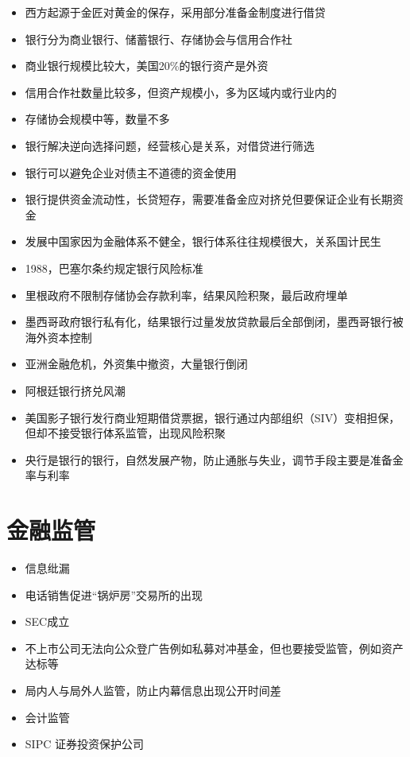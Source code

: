 \documentclass[]{book}
\providecommand{\tightlist}{%
  \setlength{\itemsep}{0pt}\setlength{\parskip}{0pt}}
\begin{document}
\begin{itemize}
\tightlist
\item
  西方起源于金匠对黄金的保存，采用部分准备金制度进行借贷
\item
  银行分为商业银行、储蓄银行、存储协会与信用合作社
\item
  商业银行规模比较大，美国20\%的银行资产是外资
\item
  信用合作社数量比较多，但资产规模小，多为区域内或行业内的
\item
  存储协会规模中等，数量不多
\item
  银行解决逆向选择问题，经营核心是关系，对借贷进行筛选
\item
  银行可以避免企业对债主不道德的资金使用
\item
  银行提供资金流动性，长贷短存，需要准备金应对挤兑但要保证企业有长期资金
\item
  发展中国家因为金融体系不健全，银行体系往往规模很大，关系国计民生
\item
  1988，巴塞尔条约规定银行风险标准
\item
  里根政府不限制存储协会存款利率，结果风险积聚，最后政府埋单
\item
  墨西哥政府银行私有化，结果银行过量发放贷款最后全部倒闭，墨西哥银行被海外资本控制
\item
  亚洲金融危机，外资集中撤资，大量银行倒闭
\item
  阿根廷银行挤兑风潮
\item
  美国影子银行发行商业短期借贷票据，银行通过内部组织（SIV）变相担保，但却不接受银行体系监管，出现风险积聚
\item
  央行是银行的银行，自然发展产物，防止通胀与失业，调节手段主要是准备金率与利率
\end{itemize}

\hypertarget{ux91d1ux878dux76d1ux7ba1}{%
\section{金融监管}\label{ux91d1ux878dux76d1ux7ba1}}

\begin{itemize}
\tightlist
\item
  信息纰漏
\item
  电话销售促进``锅炉房''交易所的出现
\item
  SEC成立
\item
  不上市公司无法向公众登广告例如私募对冲基金，但也要接受监管，例如资产达标等
\item
  局内人与局外人监管，防止内幕信息出现公开时间差
\item
  会计监管
\item
  SIPC 证券投资保护公司
\end{itemize}
\end{document}
